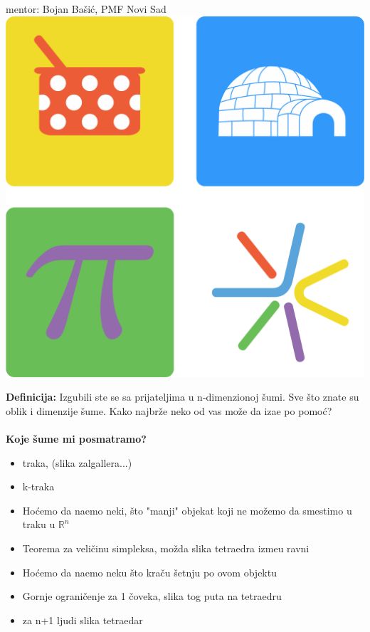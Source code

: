 \documentclass[b1paper,portrait]{template/baposter}
\begin{document}
\begin{poster}
{		   mentor: Bojan Ba\v si\' c, PMF Novi Sad
}
{\includegraphics[scale=0.25]{MatLogo}}



{ 
	\textbf{Definicija:}
 	Izgubili ste se sa prijateljima u n-dimenzionoj \v sumi.
 	Sve \v sto znate su oblik i dimenzije \v sume.
 	Kako najbr\v ze neko od vas mo\v ze da iza\dj e po pomo\' c?
 	\\
 	\\
 	\textbf{Koje \v sume mi posmatramo?}
 	\begin{itemize}
 		\item traka, (slika zalgallera...)
 		\item k-traka
 	\end{itemize}
   	\vspace{0.15cm}
}


{
	\begin{itemize}
 		\item Ho\' cemo da na\dj emo neki, \v sto "manji" objekat koji ne mo\v zemo da smestimo u traku u $\mathbb{R}^n$
 		\item Teorema za veli\v cinu simpleksa, mo\v zda slika tetraedra izme\dj u ravni
 		\item Ho\' cemo da na\dj emo neku \v sto kra\v cu \v setnju po ovom objektu
 		\item Gornje ograni\v cenje za 1 \v coveka, slika tog puta na tetraedru
 		\item za n+1 ljudi slika tetraedar
 	\end{itemize}
	 \vspace{0.15cm}
}



\end{poster}
\end{document}
